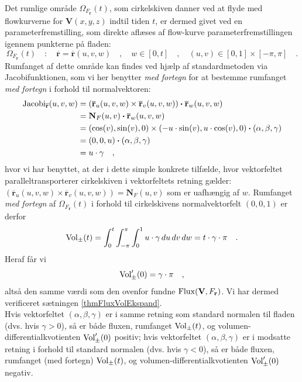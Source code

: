 \begin{example}
Det rumlige område $\Omega_{F_{\mathbf{r}}}(t)$, som cirkelskiven danner ved at flyde med flowkurverne for $\mathbf{V}(x,y,z)$ indtil tiden $t$, er dermed givet ved en parameterfremstilling, som direkte aflæses af flow-kurve parameterfremstillingen igennem punkterne på fladen:
\begin{equation}
\Omega_{F_{\mathbf{r}}}(t)\quad : \quad \overline{\mathbf{r}} =  \overline{\mathbf{r}}(u,v,w) \quad , \quad w \in [0, t] \quad , \quad (u,v) \in  [0,1]\times [-\pi, \pi] \quad .
\end{equation}
Rumfanget af dette område kan findes ved hjælp af standardmetoden via Jacobifunktionen, som vi her benytter \emph{med fortegn} for at bestemme rumfanget {\emph{med  fortegn}} i forhold til normalvektoren:
\begin{equation}
\begin{aligned}
\operatorname{Jacobi}_{\overline{\mathbf{r}}}(u,v,w) &= (\overline{\mathbf{r}}_{u}(u,v,w) \times \overline{\mathbf{r}}_{v}(u,v,w)) \bm{\cdot} \overline{\mathbf{r}}_{w}(u,v,w)  \\
&= \mathbf{N}_{F}(u,v) \bm{\cdot} \overline{\mathbf{r}}_{w}(u,v,w)  \\
&= ( \cos(v), \sin(v), 0) \times (-u\cdot \sin(v), u \cdot \cos(v), 0  ) \bm{\cdot} (\alpha, \beta, \gamma) \\
&= ( 0,0,u  ) \bm{\cdot} (\alpha, \beta, \gamma)  \\
&= u \cdot \gamma    \quad ,
\end{aligned}
\end{equation}
hvor vi har benyttet, at der i dette simple konkrete tilfælde, hvor vektorfeltet paralleltransporterer cirkelskiven i vektorfeltets retning gælder: $(\overline{\mathbf{r}}_{u}(u,v,w) \times \overline{\mathbf{r}}_{v}(u,v,w))= \mathbf{N}_{F}(u,v)$ som er uafhængig af $w$.
Rumfanget {\emph{med fortegn}} af $\Omega_{F_{\mathbf{r}}}(t)$ i forhold til cirkelskivens normalvektorfelt $(0,0,1)$ er derfor
\begin{equation}
\operatorname{Vol}_{\pm}(t) = \int_{0}^{t}\int_{-\pi}^{\pi}\int_{0}^{1} u \cdot \gamma \, du\, dv\, dw  =   t \cdot \gamma \cdot \pi \quad.
\end{equation}
Heraf får vi
\begin{equation}
\operatorname{Vol}_{\pm}'(0) = \gamma \cdot \pi \quad ,
\end{equation}
altså  den samme værdi som den ovenfor fundne $\operatorname{Flux}(\mathbf{V}, F_{\bf r})$. Vi har dermed verificeret sætningen \ref{thmFluxVolEkspand}.\\

Hvis vektorfeltet $(\alpha, \beta, \gamma)$ er i samme retning som standard normalen  til fladen (dvs. hvis  $\gamma >0$), så er både
fluxen, rumfanget  $\operatorname{Vol}_{\pm}(t)$, og volumen-differentialkvotienten $\operatorname{Vol}_{\pm}'(0)$ positiv; hvis vektorfeltet $(\alpha, \beta, \gamma)$ er i modsatte retning i forhold til standard normalen (dvs. hvis  $\gamma <0$), så er både
fluxen, rumfanget (med fortegn) $\operatorname{Vol}_{\pm}(t)$, og  volumen-differentialkvotienten $\operatorname{Vol}_{\pm}'(0)$ negativ.
\end{example}


